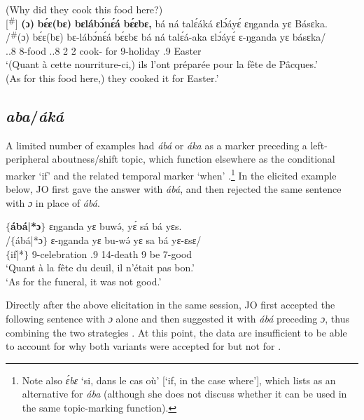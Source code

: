 \documentclass[output=paper,colorlinks,citecolor=brown
]{langscibook}
\begin{document}
\ea
\label{ex:whycookfood}
(Why did they cook this food here?) \\ 
\sn
[\textsuperscript{$\#$}]{
\glll
{\db}\textbf{(ɔ)} \textbf{bɛ́ɛ(bɛ)} \textbf{bɛlábɔ́nɛ́á} \textbf{bɛ́ɛbɛ,} bá ná talɛ́áká ɛlɔ́áyɛ́ ɛŋganda yɛ Básɛka. \\
/\textsuperscript{$\#$}(ɔ) bɛ́ɛ(bɛ) bɛ-lábɔ́nɛ́á bɛ́ɛbɛ bá ná talɛ́á-aka ɛlɔ́áyɛ́ ɛ-ŋganda yɛ básɛka/ \\
{\db}\PREP{} \DEM{}.\PROX{}.8{} 8-food \DEM{}.\PROX{}.8{} 2\SM{} \PST{}2{} cook-\DUR{} for 9-holiday \ASS{}.9{} Easter \\
\glt
`(Quant à cette nourriture-ci,) ils l'ont préparée pour la fête de Pâcques.' \\ (As for this food here,) they cooked it for Easter.' \jambox*{[PM 508] }
}

\z

\subsection{\textit{aba}/\textit{áká}}
A limited number of examples had \textit{ábá} or \textit{áka} as a marker preceding a left-peripheral aboutness/shift topic, which function elsewhere as the conditional marker `if' and the related temporal marker `when' \citep[211--212]{Dugast1971}.\footnote{Note also \textit{ɛ́bɛ} `si, dans le cas où' [`if, in the case where'], which \citet[213]{Dugast1971} lists as an alternative for \textit{ába} (although she does not discuss whether it can be used in the same topic-marking function).} In the elicited example below, JO first gave the answer with \textit{ábá}, and then rejected the same sentence with \textit{ɔ} in place of \textit{ábá}.

\ea
\label{asforfuneralaba}
\glll
{\db}\textbf{$\{$ábá|*ɔ$\}$} ɛŋganda yɛ buwə́, yɛ́ sá bá yɛs. \\
/$\{$ábá|*ɔ$\}$ ɛ-ŋganda yɛ bu-wə́ yɛ sa bá yɛ-ɛsɛ/ \\
{\db}$\{$if|*\PREP{}$\}$ 9-celebration \ASS{}.9{} 14-death 9\SM{} \NEG{} be 7-good \\
\glt
`Quant à la fête du deuil, il n'était pas bon.' \\ `As for the funeral, it was not good.' \jambox*{[JO 1648--9] }
\z

Directly after the above elicitation in the same session, JO first accepted the following sentence with \textit{ɔ} alone and then suggested it with \textit{ábá} preceding \textit{ɔ}, thus combining the two strategies . At this point, the data are insufficient to be able to account for why both variants were accepted for  but not for .\largerpage
\end{document}
